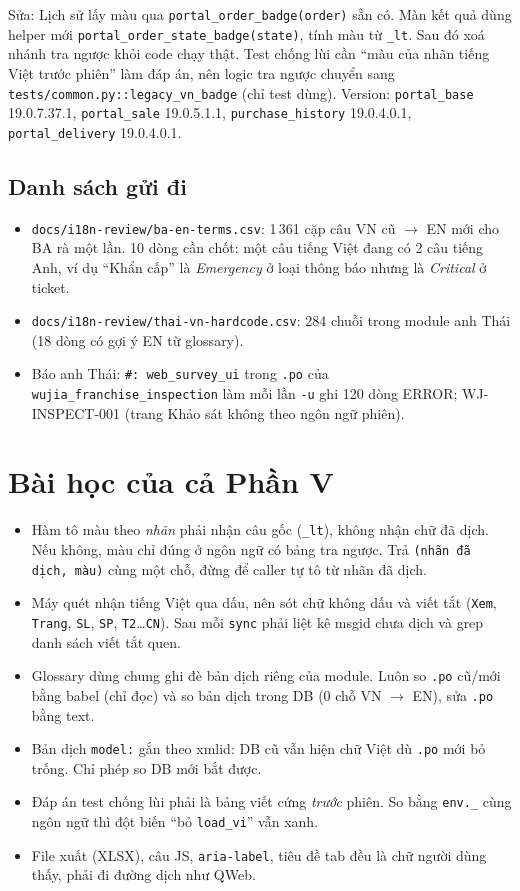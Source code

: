 Sửa: Lịch sử lấy màu qua \texttt{portal\_order\_badge(order)} sẵn có. Màn kết quả dùng helper mới
\texttt{portal\_order\_state\_badge(state)}, tính màu từ \texttt{\_lt}. Sau đó xoá nhánh tra ngược khỏi code chạy thật. Test chống lùi
cần ``màu của nhãn tiếng Việt trước phiên'' làm đáp án, nên logic tra ngược chuyển sang \texttt{tests/common.py::legacy\_vn\_badge}
(chỉ test dùng). Version: \texttt{portal\_base} 19.0.7.37.1, \texttt{portal\_sale} 19.0.5.1.1, \texttt{purchase\_history} 19.0.4.0.1,
\texttt{portal\_delivery} 19.0.4.0.1.

\subsection{Danh sách gửi đi}

\begin{itemize}[nosep]
\item \texttt{docs/i18n-review/ba-en-terms.csv}: 1\,361 cặp câu VN cũ $\to$ EN mới cho BA rà một lần. 10 dòng cần chốt: một câu
  tiếng Việt đang có 2 câu tiếng Anh, ví dụ ``Khẩn cấp'' là \emph{Emergency} ở loại thông báo nhưng là \emph{Critical} ở ticket.
\item \texttt{docs/i18n-review/thai-vn-hardcode.csv}: 284 chuỗi trong module anh Thái (18 dòng có gợi ý EN từ glossary).
\item Báo anh Thái: \texttt{\#: web\_survey\_ui} trong \texttt{.po} của \texttt{wujia\_franchise\_inspection} làm mỗi lần \texttt{-u}
  ghi 120 dòng ERROR; WJ-INSPECT-001 (trang Khảo sát không theo ngôn ngữ phiên).
\end{itemize}

\section{Bài học của cả Phần V}

\begin{itemize}[nosep]
\item Hàm tô màu theo \emph{nhãn} phải nhận câu gốc (\texttt{\_lt}), không nhận chữ đã dịch. Nếu không, màu chỉ đúng ở ngôn ngữ
  có bảng tra ngược. Trả \texttt{(nhãn đã dịch, màu)} cùng một chỗ, đừng để caller tự tô từ nhãn đã dịch.
\item Máy quét nhận tiếng Việt qua dấu, nên sót chữ không dấu và viết tắt (\texttt{Xem}, \texttt{Trang}, \texttt{SL}, \texttt{SP},
  \texttt{T2}\ldots\texttt{CN}). Sau mỗi \texttt{sync} phải liệt kê msgid chưa dịch và grep danh sách viết tắt quen.
\item Glossary dùng chung ghi đè bản dịch riêng của module. Luôn so \texttt{.po} cũ/mới bằng babel (chỉ đọc) và so bản dịch trong DB
  (0 chỗ VN $\to$ EN), sửa \texttt{.po} bằng text.
\item Bản dịch \texttt{model:} gắn theo xmlid: DB cũ vẫn hiện chữ Việt dù \texttt{.po} mới bỏ trống. Chỉ phép so DB mới bắt được.
\item Đáp án test chống lùi phải là bảng viết cứng \emph{trước} phiên. So bằng \texttt{env.\_} cùng ngôn ngữ thì đột biến ``bỏ
  \texttt{load\_vi}'' vẫn xanh.
\item File xuất (XLSX), câu JS, \texttt{aria-label}, tiêu đề tab đều là chữ người dùng thấy, phải đi đường dịch như QWeb.
\end{itemize}

